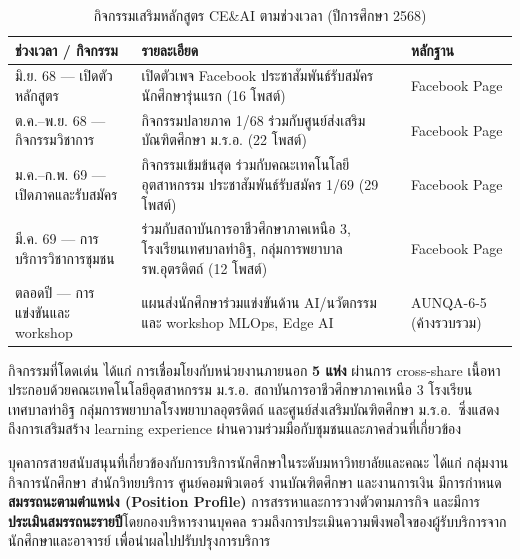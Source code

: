 \begin{table}[H]
  \centering
  \caption{กิจกรรมเสริมหลักสูตร CE\&AI ตามช่วงเวลา (ปีการศึกษา 2568)}
  \label{tbl:c6_cocurricular}
  \begingroup
  \small
  \begin{tabularx}{\linewidth}{|>{\raggedright\arraybackslash}p{3.4cm}|Y|>{\centering\arraybackslash}p{2.2cm}|}
    \hline
    \textbf{ช่วงเวลา / กิจกรรม} & \textbf{รายละเอียด} & \textbf{หลักฐาน} \\
    \hline
    มิ.ย. 68 — เปิดตัวหลักสูตร & เปิดตัวเพจ Facebook ประชาสัมพันธ์รับสมัครนักศึกษารุ่นแรก (16 โพสต์) & Facebook Page \\
    \hline
    ต.ค.–พ.ย. 68 — กิจกรรมวิชาการ & กิจกรรมปลายภาค 1/68 ร่วมกับศูนย์ส่งเสริมบัณฑิตศึกษา ม.ร.อ. (22 โพสต์) & Facebook Page \\
    \hline
    ม.ค.–ก.พ. 69 — เปิดภาคและรับสมัคร & กิจกรรมเข้มข้นสุด ร่วมกับคณะเทคโนโลยีอุตสาหกรรม ประชาสัมพันธ์รับสมัคร 1/69 (29 โพสต์) & Facebook Page \\
    \hline
    มี.ค. 69 — การบริการวิชาการชุมชน & ร่วมกับสถาบันการอาชีวศึกษาภาคเหนือ 3, โรงเรียนเทศบาลท่าอิฐ, กลุ่มการพยาบาล รพ.อุตรดิตถ์ (12 โพสต์) & Facebook Page \\
    \hline
    ตลอดปี — การแข่งขันและ workshop & แผนส่งนักศึกษาร่วมแข่งขันด้าน AI/นวัตกรรม และ workshop MLOps, Edge AI & AUNQA-6-5 (ค้างรวบรวม) \\
    \hline
  \end{tabularx}
  \endgroup
\end{table}

กิจกรรมที่โดดเด่น ได้แก่ การเชื่อมโยงกับหน่วยงานภายนอก \textbf{5 แห่ง} ผ่านการ cross-share เนื้อหา ประกอบด้วยคณะเทคโนโลยีอุตสาหกรรม ม.ร.อ. สถาบันการอาชีวศึกษาภาคเหนือ 3 โรงเรียนเทศบาลท่าอิฐ กลุ่มการพยาบาลโรงพยาบาลอุตรดิตถ์ และศูนย์ส่งเสริมบัณฑิตศึกษา ม.ร.อ.\ ซึ่งแสดงถึงการเสริมสร้าง learning experience ผ่านความร่วมมือกับชุมชนและภาคส่วนที่เกี่ยวข้อง



บุคลากรสายสนับสนุนที่เกี่ยวข้องกับการบริการนักศึกษาในระดับมหาวิทยาลัยและคณะ ได้แก่ กลุ่มงานกิจการนักศึกษา สำนักวิทยบริการ ศูนย์คอมพิวเตอร์ งานบัณฑิตศึกษา และงานการเงิน มีการกำหนด\textbf{สมรรถนะตามตำแหน่ง (Position Profile)} การสรรหาและการวางตัวตามภารกิจ และมีการ\textbf{ประเมินสมรรถนะรายปี}โดยกองบริหารงานบุคคล รวมถึงการประเมินความพึงพอใจของผู้รับบริการจากนักศึกษาและอาจารย์ เพื่อนำผลไปปรับปรุงการบริการ

